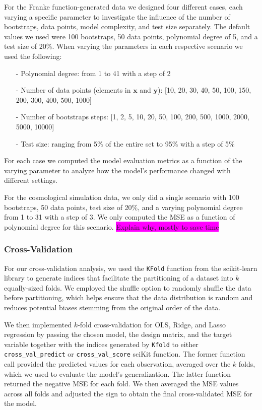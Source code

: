 \documentclass[aps,pra,english,notitlepage,reprint,nofootinbib]{revtex4-1}  %
\begin{document}
For the Franke function-generated data we designed four different cases, each varying a specific parameter to investigate the influence of the number of bootstraps, data points, model complexity, and test size separately. The default values we used were 100 bootstraps, 50 data points, polynomial degree of 5, and a test size of 20\%. When varying the parameters in each respective scenario we used the following: 
\begin{itemize}
   \item [-] Polynomial degree: from 1 to 41 with a step of 2
   \item [-] Number of data points (elements in $\mathbf{x}$ and $\mathbf{y}$):\hspace{10pt} [10, 20, 30, 40, 50, 100, 150, 200, 300, 400, 500, 1000]
   \item [-] Number of bootstraps steps: [1, 2, 5, 10, 20, 50, 100, 200, 500, 1000, 2000, 5000, 10000]
   \item [-] Test size: ranging from 5\% of the entire set to 95\% with a step of 5\%
\end{itemize}
For each case we computed the model evaluation metrics as a function of the varying parameter to analyze how the model's performance changed with different settings. 

For the cosmological simulation data, we only did a single scenario with 100 bootstraps, 50 data points, test size of 20\%, and a varying polynomial degree from 1 to 31 with a step of 3. We only computed the MSE as a function of polynomial degree for this scenario. \colorbox{magenta}{Explain why, mostly to save time}

\subsubsection{Cross-Validation}

For our cross-validation analysis, we used the \verb|KFold| function from the scikit-learn library to generate indices that facilitate the partitioning of a dataset into $k$ equally-sized folds. We employed the shuffle option to randomly shuffle the data before partitioning, which helps ensure that the data distribution is random and reduces potential biases stemming from the original order of the data. 

We then implemented $k$-fold cross-validation for OLS, Ridge, and Lasso regression by passing the chosen model, the design matrix, and the target variable together with the indices generated by \verb|Kfold| to either \verb|cross_val_predict| or \verb|cross_val_score| sciKit function. The former function call provided the predicted values for each observation, averaged over the $k$ folds, which we used to evaluate the model's generalization. The latter function returned the negative MSE for each fold. We then averaged the MSE values across all folds and adjusted the sign to obtain the final cross-validated MSE for the model.
\end{document}

